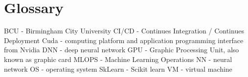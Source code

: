 \section*{Glossary}
BCU - Birmingham City University
\newline
CI/CD - Continues Integration / Continues Deployment
\newline
Cuda - computing platform and application programming interface from Nvidia \parencite{web:NvidiaCuda}
\newline
DNN - deep neural network
\newline
GPU - Graphic Processing Unit, also known as graphic card
\newline
MLOPS - Machine Learning Operations
\newline
NN - neural network
\newline
OS - operating system
\newline
SkLearn - Scikit learn
\newline
VM - virtual machine 
\newpage